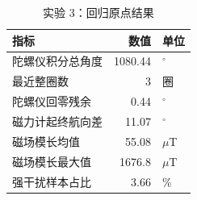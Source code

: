 \begin{table}[H]
\centering
\begin{tabular}{lrl}
\toprule
指标 & 数值 & 单位 \\
\midrule
陀螺仪积分总角度 & 1080.44 & $^\circ$ \\
最近整圈数 & 3 & 圈 \\
陀螺仪回零残余 & 0.44 & $^\circ$ \\
磁力计起终航向差 & 11.07 & $^\circ$ \\
磁场模长均值 & 55.08 & $\mu$T \\
磁场模长最大值 & 1676.8 & $\mu$T \\
强干扰样本占比 & 3.66 & \% \\
\bottomrule
\end{tabular}
\caption{实验 3：回归原点结果}
\label{tab:exp3}
\end{table}

